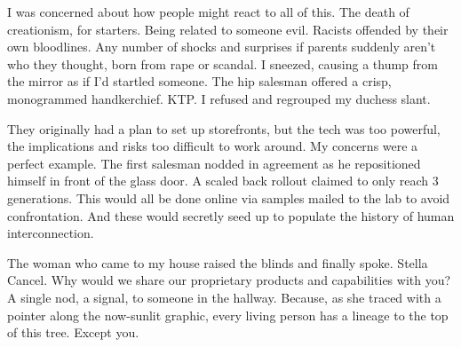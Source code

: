 I was concerned about how people might react to all of this. The death
of creationism, for starters. Being related to someone evil. Racists
offended by their own bloodlines. Any number of shocks and surprises if
parents suddenly aren't who they thought, born from rape or scandal. I
sneezed, causing a thump from the mirror as if I'd startled someone. The
hip salesman offered a crisp, monogrammed handkerchief. KTP. I refused
and regrouped my duchess slant.

They originally had a plan to set up storefronts, but the tech was too
powerful, the implications and risks too difficult to work around. My
concerns were a perfect example. The first salesman nodded in agreement
as he repositioned himself in front of the glass door. A scaled back
rollout claimed to only reach 3 generations. This would all be done
online via samples mailed to the lab to avoid confrontation. And these
would secretly seed up to populate the history of human interconnection.

The woman who came to my house raised the blinds and finally spoke.
Stella Cancel. Why would we share our proprietary products and
capabilities with you? A single nod, a signal, to someone in the
hallway. Because, as she traced with a pointer along the now-sunlit
graphic, every living person has a lineage to the top of this tree.
Except you.
